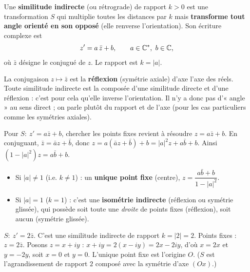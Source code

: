 \begin{definition}
Une \textbf{similitude indirecte} (ou rétrograde) de rapport $k>0$ est une transformation $S$ qui multiplie
toutes les distances par $k$ mais \textbf{transforme tout angle orienté en son opposé} (elle renverse
l'orientation). Son écriture complexe est
\[
z'=a\,\bar z+b,\qquad a\in\C^{*},\ b\in\C,
\]
où $\bar z$ désigne le conjugué de $z$. Le rapport est $k=|a|$.
\end{definition}

\begin{remarque}
La conjugaison $z\mapsto\bar z$ est la \textbf{réflexion} (symétrie axiale) d'axe l'axe des réels. Toute
similitude indirecte est la composée d'une similitude directe et d'une réflexion : c'est pour cela qu'elle
inverse l'orientation. Il n'y a donc pas d'« angle » au sens direct ; on parle plutôt du rapport et de
l'axe (pour les cas particuliers comme les symétries axiales).
\end{remarque}

\begin{propriete}
Pour $S:\ z'=a\bar z+b$, chercher les points fixes revient à résoudre $z=a\bar z+b$. En conjuguant,
$\bar z=\bar a z+\bar b$, donc $z=a(\bar a z+\bar b)+b=|a|^{2}z+a\bar b+b$. Ainsi
$(1-|a|^{2})z=a\bar b+b$.
\begin{itemize}
\item Si $|a|\neq1$ (i.e. $k\neq1$) : un \textbf{unique point fixe} (centre), $z=\dfrac{a\bar b+b}{1-|a|^{2}}$.
\item Si $|a|=1$ ($k=1$) : c'est une \textbf{isométrie indirecte} (réflexion ou symétrie glissée),
qui possède soit toute une \emph{droite} de points fixes (réflexion), soit aucun (symétrie glissée).
\end{itemize}
\end{propriete}

\begin{exemple}
$S:\ z'=2\bar z$. C'est une similitude indirecte de rapport $k=|2|=2$. Points fixes :
$z=2\bar z$. Posons $z=x+iy$ : $x+iy=2(x-iy)=2x-2iy$, d'où $x=2x$ et $y=-2y$, soit $x=0$ et $y=0$.
L'unique point fixe est l'origine $O$. ($S$ est l'agrandissement de rapport $2$ composé avec la symétrie
d'axe $(Ox)$.)
\end{exemple}

